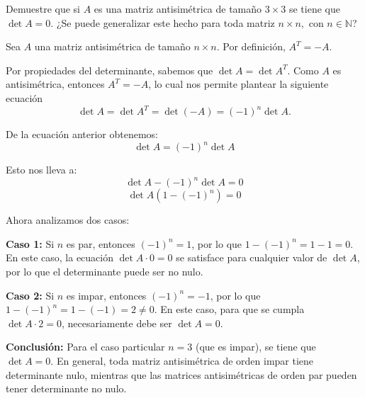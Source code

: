 \begin{prob} 
Demuestre que si $A$ es una matriz antisimétrica de tamaño $3\times 3$ se tiene que $\det A=0.$ ¿Se puede generalizar este hecho para toda matriz $n \times n,$ con $n\in \mathbb{N}$?

\begin{myproof}
Sea $A$ una matriz antisimétrica de tamaño $n \times n$. Por definición, $A^{T} = -A$.

Por propiedades del determinante, sabemos que $\det A = \det A^{T}$. Como $A$ es antisimétrica, entonces $A^{T} = -A$, lo cual nos permite plantear la siguiente ecuación $$\det A = \det A^{T}= \det (-A)= (-1)^{n}\det A.$$

De la ecuación anterior obtenemos:
$$\det A = (-1)^{n}\det A$$

Esto nos lleva a:
$$\det A - (-1)^{n}\det A = 0$$
$$\det A(1 - (-1)^{n}) = 0$$

Ahora analizamos dos casos:

\textbf{Caso 1:} Si $n$ es par, entonces $(-1)^{n} = 1$, por lo que $1 - (-1)^{n} = 1 - 1 = 0$. En este caso, la ecuación $\det A \cdot 0 = 0$ se satisface para cualquier valor de $\det A$, por lo que el determinante puede ser no nulo.

\textbf{Caso 2:} Si $n$ es impar, entonces $(-1)^{n} = -1$, por lo que $1 - (-1)^{n} = 1 - (-1) = 2 \neq 0$. En este caso, para que se cumpla $\det A \cdot 2 = 0$, necesariamente debe ser $\det A = 0$.

\textbf{Conclusión:} Para el caso particular $n = 3$ (que es impar), se tiene que $\det A = 0$. En general, toda matriz antisimétrica de orden impar tiene determinante nulo, mientras que las matrices antisimétricas de orden par pueden tener determinante no nulo.

\end{myproof}
\end{prob}


